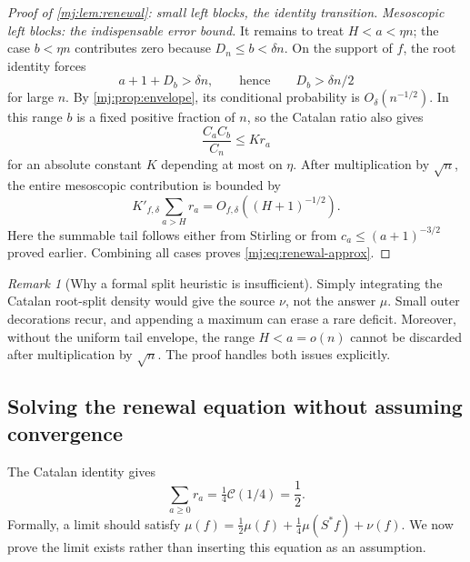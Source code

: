 \documentclass[11pt,a4paper]{article}
\theoremstyle{definition}\newaliascnt{definition}{theorem}
\theoremstyle{remark}\newaliascnt{remark}{theorem}
\newtheorem{remark}[remark]{Remark}
\newcommand{\Cat}{\mathcal C}
\begin{document}
\begin{proof}[Proof of \cref{mj:lem:renewal}: small left blocks, the identity transition]
\emph{Mesoscopic left blocks: the indispensable error bound.}
It remains to treat $H<a<\eta n$; the case $b<\eta n$ contributes zero
because $D_n\le b<\delta n$. On the support of $f$, the root identity forces
\[
 a+1+D_b>\delta n,
 \qquad\text{hence}\qquad D_b>\delta n/2
\]
for large $n$. By \cref{mj:prop:envelope}, its conditional probability is
$O_\delta(n^{-1/2})$. In this range $b$ is a fixed positive fraction of $n$,
so the Catalan ratio also gives
\[
 \frac{C_aC_b}{C_n}\le K r_a
\]
for an absolute constant $K$ depending at most on $\eta$. After
multiplication by $\sqrt n$, the entire mesoscopic contribution is bounded
by
\[
 K'_{f,\delta}\sum_{a>H}r_a
 =O_{f,\delta}((H+1)^{-1/2}).
\]
Here the summable tail follows either from Stirling or from
$c_a\le(a+1)^{-3/2}$ proved earlier. Combining all cases proves
\eqref{mj:eq:renewal-approx}.
\end{proof}

\begin{remark}[Why a formal split heuristic is insufficient]
\label{mj:rem:heuristic}
Simply integrating the Catalan root-split density would give the source
$\nu$, not the answer $\mu$. Small outer decorations recur, and appending a
maximum can erase a rare deficit. Moreover, without the uniform tail
envelope, the range $H<a=o(n)$ cannot be discarded after multiplication by
$\sqrt n$. The proof handles both issues explicitly.
\end{remark}

\subsection{Solving the renewal equation without assuming convergence}
The Catalan identity gives
\begin{equation}
 \sum_{a\ge0}r_a=\tfrac14\Cat(1/4)=\frac12.
 \label{mj:eq:mass-r}
\end{equation}
Formally, a limit should satisfy
$\mu(f)=\frac12\mu(f)+\frac14\mu(S^\ast f)+\nu(f)$. We now prove the limit
exists rather than inserting this equation as an assumption.
\end{document}
